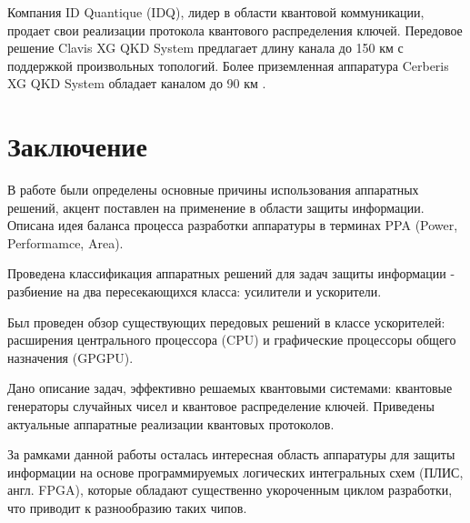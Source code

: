 \documentclass[a4paper,12pt]{article}
\begin{document}
Компания ID Quantique (IDQ), лидер в области квантовой коммуникации, продает свои реализации протокола квантового распределения ключей. Передовое решение Clavis XG QKD System предлагает длину канала до 150 км с поддержкой произвольных топологий. Более приземленная аппаратура Cerberis XG QKD System обладает каналом до 90 км \cite{IDQ_QKD}. 

\section{Заключение}


В работе были определены основные причины использования аппаратных решений, акцент поставлен на применение в области защиты информации. Описана идея баланса процесса разработки аппаратуры в терминах PPA (Power, Performamce, Area).

Проведена классификация аппаратных решений для задач защиты информации - разбиение на два пересекающихся класса: усилители и ускорители.

Был проведен обзор существующих передовых решений в классе ускорителей: расширения центрального процессора (CPU) и графические процессоры общего назначения (GPGPU). 

Дано описание задач, эффективно решаемых квантовыми системами: квантовые генераторы случайных чисел и квантовое распределение ключей. Приведены актуальные аппаратные реализации квантовых протоколов.

За рамками данной работы осталась интересная область аппаратуры для защиты информации на основе программируемых логических интегральных схем (ПЛИС, англ. FPGA), которые обладают существенно укороченным циклом разработки, что приводит к разнообразию таких чипов.





\newpage



\end{document}
